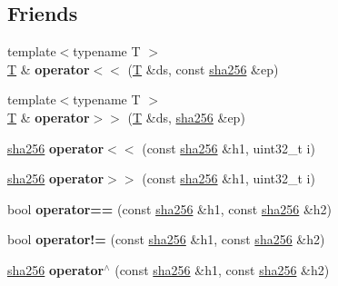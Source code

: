 \subsection*{Friends}
\begin{DoxyCompactItemize}
\item 
\mbox{\label{classfc_1_1sha256_a7307d901ab9d4c4c7f007dace95a786a}} 
{\footnotesize template$<$typename T $>$ }\\\mbox{\hyperlink{struct_t}{T}} \& {\bfseries operator$<$$<$} (\mbox{\hyperlink{struct_t}{T}} \&ds, const \mbox{\hyperlink{classfc_1_1sha256}{sha256}} \&ep)
\item 
\mbox{\label{classfc_1_1sha256_a7410948fd19219cd8537f10abc29cbdc}} 
{\footnotesize template$<$typename T $>$ }\\\mbox{\hyperlink{struct_t}{T}} \& {\bfseries operator$>$$>$} (\mbox{\hyperlink{struct_t}{T}} \&ds, \mbox{\hyperlink{classfc_1_1sha256}{sha256}} \&ep)
\item 
\mbox{\label{classfc_1_1sha256_a34b52173b29cfa9fd29d6ed985800edc}} 
\mbox{\hyperlink{classfc_1_1sha256}{sha256}} {\bfseries operator$<$$<$} (const \mbox{\hyperlink{classfc_1_1sha256}{sha256}} \&h1, uint32\+\_\+t i)
\item 
\mbox{\label{classfc_1_1sha256_a5eda7dfcacbe16a0212c64ea1ab4589e}} 
\mbox{\hyperlink{classfc_1_1sha256}{sha256}} {\bfseries operator$>$$>$} (const \mbox{\hyperlink{classfc_1_1sha256}{sha256}} \&h1, uint32\+\_\+t i)
\item 
\mbox{\label{classfc_1_1sha256_ae738960f49248fd220cd37e46bb2bf48}} 
bool {\bfseries operator==} (const \mbox{\hyperlink{classfc_1_1sha256}{sha256}} \&h1, const \mbox{\hyperlink{classfc_1_1sha256}{sha256}} \&h2)
\item 
\mbox{\label{classfc_1_1sha256_a54d8cde874899fec40491c31cb4ec9f4}} 
bool {\bfseries operator!=} (const \mbox{\hyperlink{classfc_1_1sha256}{sha256}} \&h1, const \mbox{\hyperlink{classfc_1_1sha256}{sha256}} \&h2)
\item 
\mbox{\label{classfc_1_1sha256_a230a1674fe53c0e967b2b7e3236639f0}} 
\mbox{\hyperlink{classfc_1_1sha256}{sha256}} {\bfseries operator$^\wedge$} (const \mbox{\hyperlink{classfc_1_1sha256}{sha256}} \&h1, const \mbox{\hyperlink{classfc_1_1sha256}{sha256}} \&h2)

\end{DoxyCompactItemize}
